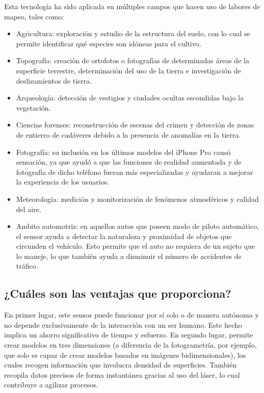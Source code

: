 Esta tecnología ha sido aplicada en múltiples campos que hacen uso de labores de mapeo, tales como:

\begin{itemize}
    \item Agricultura: exploración y estudio de la estructura del suelo, con lo cual se permite identificar qué especies son idóneas para el cultivo.
    \item Topografía: creación de ortofotos o fotografías de determinadas áreas de la superficie terrestre, determinación del uso de la tierra e investigación de deslizamientos de tierra.
    \item Arqueología: detección de vestigios y ciudades ocultas escondidas bajo la vegetación.
    \item Ciencias forenses: reconstrucción de escenas del crimen y detección de zonas de entierro de cadáveres debido a la presencia de anomalías en la tierra.
    \item Fotografía: su inclusión en los últimos modelos del iPhone Pro causó sensación, ya que ayudó a que las funciones de realidad aumentada y de fotografía de dicho teléfono fueran más especializadas y ayudaran a mejorar la experiencia de los usuarios.
    \item Meteorología: medición y monitorización de fenómenos atmosféricos y calidad del aire.
    \item Ambito automotriz: en aquellos autos que poseen modo de piloto automático, el sensor ayuda a detectar la naturaleza y proximidad de objetos que circunden el vehículo. Esto permite que el auto no requiera de un sujeto que lo maneje, lo que también ayuda a disminuir el número de accidentes de tráfico.
\end{itemize}

\subsection{¿Cuáles son las ventajas que proporciona?}

En primer lugar, este sensor puede funcionar por sí solo o de manera autónoma y no depende exclusivamente de la interacción con un ser humano. Este hecho implica un ahorro significativo de tiempo y esfuerzo. En segundo lugar, permite crear modelos en tres dimensiones (a diferencia de la fotogrametría, por ejemplo, que solo es capaz de crear modelos basados en imágenes bidimensionales), los cuales recogen información que involucra densidad de superficies. También recopila datos precisos de forma instantánea gracias al uso del láser, lo cual contribuye a agilizar procesos.


